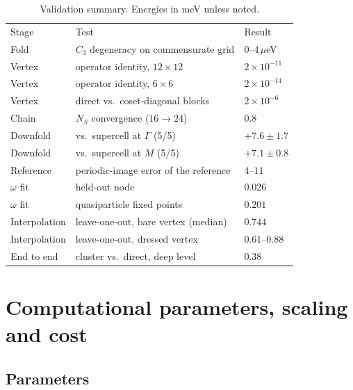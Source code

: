 \documentclass[aps,prx,reprint,superscriptaddress,nofootinbib,longbibliography]{revtex4-2}
\begin{document}
\begin{table}[t]
\caption{Validation summary. Energies in meV unless noted.}
\label{tab:validation}
\begin{ruledtabular}
\begin{tabular}{lll}
Stage & Test & Result \\
\colrule
Fold          & $C_3$ degeneracy on commensurate grid & $0$--$4\,\mu$eV \\
Vertex        & operator identity, $12\times12$        & $2\times10^{-11}$ \\
Vertex        & operator identity, $6\times6$          & $2\times10^{-14}$ \\
Vertex        & direct vs.\ coset-diagonal blocks      & $2\times10^{-6}$ \\
Chain         & $N_S$ convergence ($16 \to 24$)        & $0.8$ \\
Downfold      & vs.\ supercell at $\Gamma$ (5/5)       & $+7.6 \pm 1.7$ \\
Downfold      & vs.\ supercell at $M$ (5/5)            & $+7.1 \pm 0.8$ \\
Reference     & periodic-image error of the reference  & $4$--$11$ \\
$\omega$ fit  & held-out node                          & $0.026$ \\
$\omega$ fit  & quasiparticle fixed points             & $0.201$ \\
Interpolation & leave-one-out, bare vertex (median)    & $0.744$ \\
Interpolation & leave-one-out, dressed vertex          & $0.61$--$0.88$ \\
End to end    & cluster vs.\ direct, deep level        & $0.38$ \\
\end{tabular}
\end{ruledtabular}
\end{table}


\section{Computational parameters, scaling and cost}
\label{sec:cost}

\subsection{Parameters}
\end{document}
